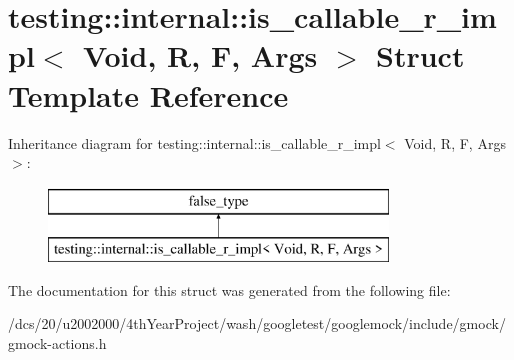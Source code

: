 \hypertarget{structtesting_1_1internal_1_1is__callable__r__impl}{}\section{testing\+:\+:internal\+:\+:is\+\_\+callable\+\_\+r\+\_\+impl$<$ Void, R, F, Args $>$ Struct Template Reference}
\label{structtesting_1_1internal_1_1is__callable__r__impl}
Inheritance diagram for testing\+:\+:internal\+:\+:is\+\_\+callable\+\_\+r\+\_\+impl$<$ Void, R, F, Args $>$\+:\begin{figure}[H]
\begin{center}
\leavevmode
\includegraphics[height=2.000000cm]{structtesting_1_1internal_1_1is__callable__r__impl}
\end{center}
\end{figure}


The documentation for this struct was generated from the following file\+:\begin{DoxyCompactItemize}
\item 
/dcs/20/u2002000/4th\+Year\+Project/wash/googletest/googlemock/include/gmock/gmock-\/actions.\+h\end{DoxyCompactItemize}
